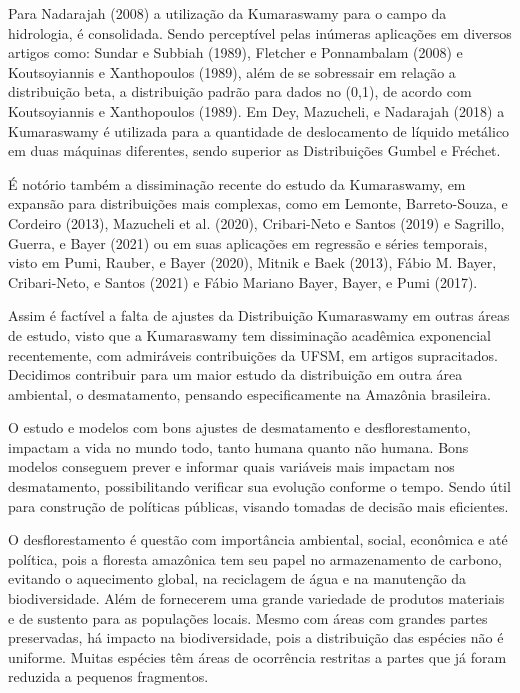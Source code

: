 \documentclass[
]{article}
\begin{document}
Para Nadarajah (2008) a utilização da Kumaraswamy para o campo da
hidrologia, é consolidada. Sendo perceptível pelas inúmeras aplicações
em diversos artigos como: Sundar e Subbiah (1989), Fletcher e
Ponnambalam (2008) e Koutsoyiannis e Xanthopoulos (1989), além de se
sobressair em relação a distribuição beta, a distribuição padrão para
dados no (0,1), de acordo com Koutsoyiannis e Xanthopoulos (1989). Em
Dey, Mazucheli, e Nadarajah (2018) a Kumaraswamy é utilizada para a
quantidade de deslocamento de líquido metálico em duas máquinas
diferentes, sendo superior as Distribuições Gumbel e Fréchet.

É notório também a dissiminação recente do estudo da Kumaraswamy, em
expansão para distribuições mais complexas, como em Lemonte,
Barreto-Souza, e Cordeiro (2013), Mazucheli et al. (2020), Cribari-Neto
e Santos (2019) e Sagrillo, Guerra, e Bayer (2021) ou em suas aplicações
em regressão e séries temporais, visto em Pumi, Rauber, e Bayer (2020),
Mitnik e Baek (2013), Fábio M. Bayer, Cribari-Neto, e Santos (2021) e
Fábio Mariano Bayer, Bayer, e Pumi (2017).

Assim é factível a falta de ajustes da Distribuição Kumaraswamy em
outras áreas de estudo, visto que a Kumaraswamy tem dissiminação
acadêmica exponencial recentemente, com admiráveis contribuições da
UFSM, em artigos supracitados. Decidimos contribuir para um maior estudo
da distribuição em outra área ambiental, o desmatamento, pensando
especificamente na Amazônia brasileira.

O estudo e modelos com bons ajustes de desmatamento e desflorestamento,
impactam a vida no mundo todo, tanto humana quanto não humana. Bons
modelos conseguem prever e informar quais variáveis mais impactam nos
desmatamento, possibilitando verificar sua evolução conforme o tempo.
Sendo útil para construção de políticas públicas, visando tomadas de
decisão mais eficientes.

O desflorestamento é questão com importância ambiental, social,
econômica e até política, pois a floresta amazônica tem seu papel no
armazenamento de carbono, evitando o aquecimento global, na reciclagem
de água e na manutenção da biodiversidade. Além de fornecerem uma grande
variedade de produtos materiais e de sustento para as populações locais.
Mesmo com áreas com grandes partes preservadas, há impacto na
biodiversidade, pois a distribuição das espécies não é uniforme. Muitas
espécies têm áreas de ocorrência restritas a partes que já foram
reduzida a pequenos fragmentos.
\end{document}
